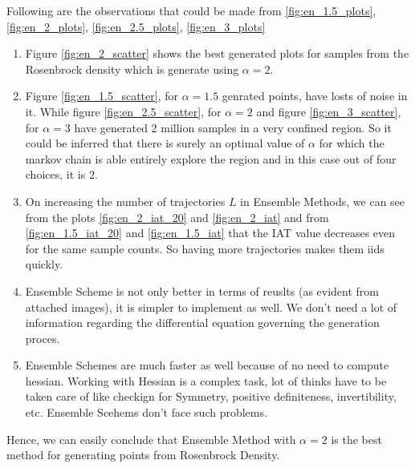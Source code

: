 \documentclass[11pt]{article}
\begin{document}
Following are the observations that could be made from \ref{fig:en_1.5_plots}, \ref{fig:en_2_plots}, \ref{fig:en_2.5_plots}, \ref{fig:en_3_plots}
\begin{enumerate}
	\item Figure \ref{fig:en_2_scatter} shows the best generated plots for samples from the Rosenbrock density which is generate using $\alpha = 2$.
	\item Figure \ref{fig:en_1.5_scatter}, for $\alpha = 1.5$ genrated points, have losts of noise in it. While figure \ref{fig:en_2.5_scatter}, for $\alpha = 2$ and figure \ref{fig:en_3_scatter}, for $\alpha = 3$ have generated
	2 million samples in a very confined region. So it could be inferred that there is surely an optimal value of $\alpha$ for which the markov chain is able
	entirely explore the region and in this case out of four choices, it is $2$.
	\item On increasing the number of trajectories $L$ in Ensemble Methods, we can see from the plots \ref{fig:en_2_iat_20} and \ref{fig:en_2_iat} and from \ref{fig:en_1.5_iat_20} and \ref{fig:en_1.5_iat} that the IAT value decreases even for the same sample counts. So having more trajectories makes them iids quickly.
	\item Ensemble Scheme is not only better in terms of reuslts (as evident from attached images), it is simpler to implement as well. We don't need a lot of information regarding the
	differential equation governing the generation proces.
	\item Ensemble Schemes are much faster as well because of no need to compute hessian. Working with Hessian is a complex task, lot of thinks have to be taken care of like checkign for Symmetry, positive definiteness, invertibility, etc.
	Ensemble Scehems don't face such problems.
\end{enumerate}

Hence, we can easily conclude that Ensemble Method with $\alpha = 2$ is the best method for generating points from Rosenbrock Density.
\end{document}
